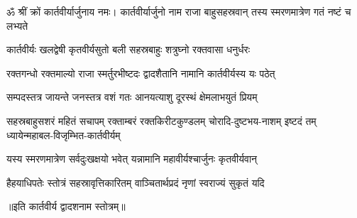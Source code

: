 

ॐ श्रीं क्रों कार्तवीर्यार्जुनाय नमः।
\twolineshloka
{कार्तवीर्यार्जुनो नाम राजा बाहुसहस्रवान्}
{तस्य स्मरणमात्रेण गतं नष्टं च लभ्यते}%

\twolineshloka
{कार्तवीर्यः खलद्वेषी कृतवीर्यसुतो बली}
{सहस्रबाहुः शत्रुघ्नो रक्तवासा धनुर्धरः}%

\twolineshloka
{रक्तगन्धो रक्तमाल्यो राजा स्मर्तुरभीष्टदः}
{द्वादशैतानि नामानि कार्तवीर्यस्य यः पठेत्}%

\twolineshloka
{सम्पदस्तत्र जायन्ते जनस्तत्र वशं गतः}
{आनयत्याशु दूरस्थं क्षेमलाभयुतं प्रियम्}%

\fourlineindentedshloka
{सहस्रबाहुसशरं महितं सचापम्}
{रक्ताम्बरं रक्तकिरीटकुण्डलम्}
{चोरादि-दुष्टभय-नाशम् इष्टदं तम्}
{ध्यायेन्महाबल-विजृम्भित-कार्तवीर्यम्}%

\twolineshloka
{यस्य स्मरणमात्रेण सर्वदुःखक्षयो भवेत्}
{यन्नामानि महावीर्यश्चार्जुनः कृतवीर्यवान्}%

\twolineshloka
{हैहयाधिपतेः स्तोत्रं सहस्रावृत्तिकारितम्}
{वाञ्चितार्थप्रदं नृणां स्वराज्यं सुकृतं यदि}%

॥इति कार्तवीर्य द्वादशनाम स्तोत्रम्॥